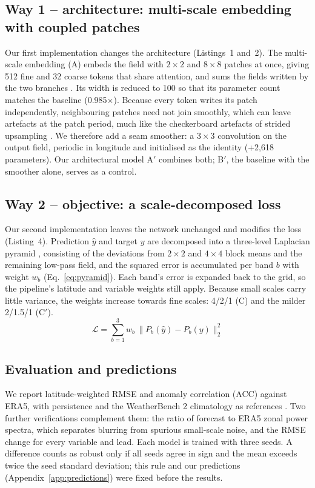 \documentclass{article}
\begin{document}
\subsection{Way 1 -- architecture: multi-scale embedding with coupled patches}
Our first implementation changes the architecture (Listings~1 and~2). The multi-scale embedding (A) embeds the field with $2\times2$ and $8\times8$ patches at once, giving 512 fine and 32 coarse tokens that share attention, and sums the fields written by the two branches \cite{chen2021crossvit, fan2021mvit}. Its width is reduced to 100 so that its parameter count matches the baseline (0.985$\times$). Because every token writes its patch independently, neighbouring patches need not join smoothly, which can leave artefacts at the patch period, much like the checkerboard artefacts of strided upsampling \cite{odena2016checkerboard}. We therefore add a seam smoother: a $3\times3$ convolution on the output field, periodic in longitude and initialised as the identity (+2,618 parameters). Our architectural model A$'$ combines both; B$'$, the baseline with the smoother alone, serves as a control.

\subsection{Way 2 -- objective: a scale-decomposed loss}
Our second implementation leaves the network unchanged and modifies the loss (Listing~4). Prediction $\hat{y}$ and target $y$ are decomposed into a three-level Laplacian pyramid \cite{burt1983laplacian}, consisting of the deviations from $2\times2$ and $4\times4$ block means and the remaining low-pass field, and the squared error is accumulated per band $b$ with weight $w_b$ (Eq.~\ref{eq:pyramid}). Each band's error is expanded back to the grid, so the pipeline's latitude and variable weights still apply. Because small scales carry little variance, the weights increase towards fine scales: 4/2/1 (C) and the milder 2/1.5/1 (C$'$).
\begin{equation}
  \mathcal{L} = \sum_{b=1}^{3} w_b \, \big\lVert P_b(\hat{y}) - P_b(y) \big\rVert_2^2
  \label{eq:pyramid}
\end{equation}

\subsection{Evaluation and predictions}
We report latitude-weighted RMSE and anomaly correlation (ACC) against ERA5, with persistence and the WeatherBench 2 climatology as references \cite{rasp2024weatherbench2}. Two further verifications complement them: the ratio of forecast to ERA5 zonal power spectra, which separates blurring from spurious small-scale noise, and the RMSE change for every variable and lead. Each model is trained with three seeds. A difference counts as robust only if all seeds agree in sign and the mean exceeds twice the seed standard deviation; this rule and our predictions (Appendix~\ref{app:predictions}) were fixed before the results.
\end{document}

